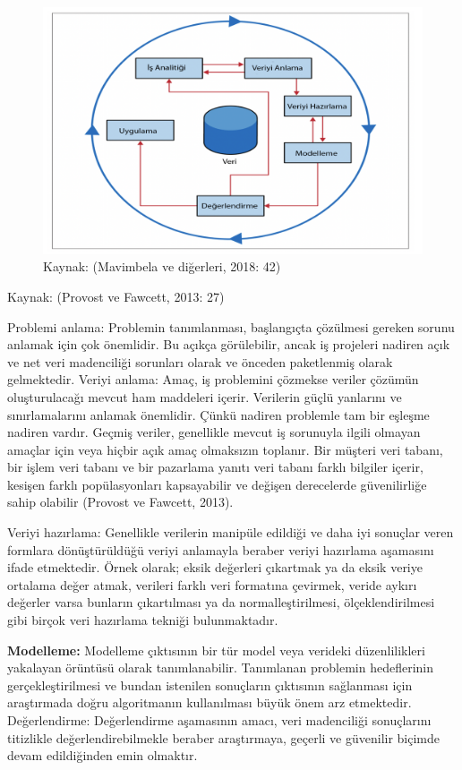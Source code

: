 \documentclass[
]{book}
\begin{document}
\begin{figure}
\includegraphics[width=0.95\linewidth,height=0.95\textheight]{tablolar-sekiller/sekil-4-1} \caption{Kaynak: (Mavimbela ve diğerleri, 2018: 42)}\label{fig:unnamed-chunk-1}
\end{figure}

Kaynak: (Provost ve Fawcett, 2013: 27) \citep{provost2013data}

Problemi anlama: Problemin tanımlanması, başlangıçta çözülmesi gereken sorunu anlamak için çok önemlidir. Bu açıkça görülebilir, ancak iş projeleri nadiren açık ve net veri madenciliği sorunları olarak ve önceden paketlenmiş olarak gelmektedir.
Veriyi anlama: Amaç, iş problemini çözmekse veriler çözümün oluşturulacağı mevcut ham maddeleri içerir. Verilerin güçlü yanlarını ve sınırlamalarını anlamak önemlidir. Çünkü nadiren problemle tam bir eşleşme nadiren vardır. Geçmiş veriler, genellikle mevcut iş sorunuyla ilgili olmayan amaçlar için veya hiçbir açık amaç olmaksızın toplanır. Bir müşteri veri tabanı, bir işlem veri tabanı ve bir pazarlama yanıtı veri tabanı farklı bilgiler içerir, kesişen farklı popülasyonları kapsayabilir ve değişen derecelerde güvenilirliğe sahip olabilir (Provost ve Fawcett, 2013). \citep{provost2013data}

Veriyi hazırlama: Genellikle verilerin manipüle edildiği ve daha iyi sonuçlar veren formlara dönüştürüldüğü veriyi anlamayla beraber veriyi hazırlama aşamasını ifade etmektedir. Örnek olarak; eksik değerleri çıkartmak ya da eksik veriye ortalama değer atmak, verileri farklı veri formatına çevirmek, veride aykırı değerler varsa bunların çıkartılması ya da normalleştirilmesi, ölçeklendirilmesi gibi birçok veri hazırlama tekniği bulunmaktadır.

\textbf{Modelleme:} Modelleme çıktısının bir tür model veya verideki düzenlilikleri yakalayan örüntüsü olarak tanımlanabilir. Tanımlanan problemin hedeflerinin gerçekleştirilmesi ve bundan istenilen sonuçların çıktısının sağlanması için araştırmada doğru algoritmanın kullanılması büyük önem arz etmektedir.
Değerlendirme: Değerlendirme aşamasının amacı, veri madenciliği sonuçlarını titizlikle değerlendirebilmekle beraber araştırmaya, geçerli ve güvenilir biçimde devam edildiğinden emin olmaktır.
\end{document}
